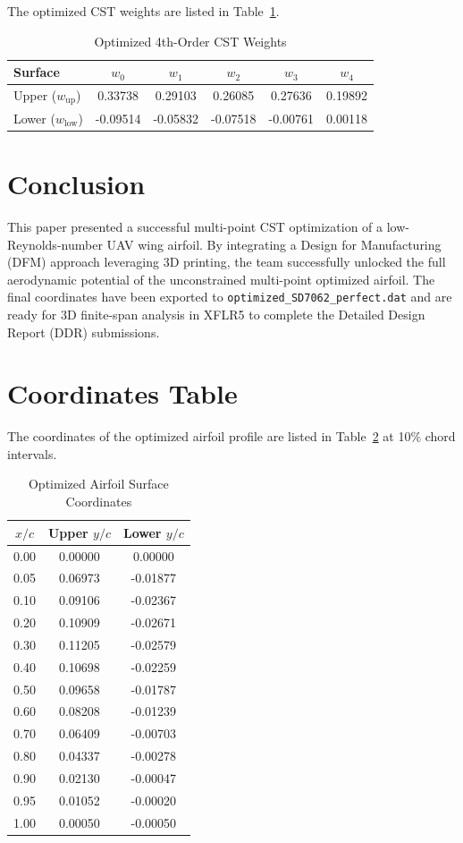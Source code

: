 \documentclass[11pt]{article}
\begin{document}
The optimized CST weights are listed in Table~\ref{tab:weights}.

\begin{table}[h]
\centering
\caption{Optimized 4th-Order CST Weights}
\label{tab:weights}
\begin{tabular}{lccccc}
\toprule
Surface & $w_0$ & $w_1$ & $w_2$ & $w_3$ & $w_4$ \\
\midrule
Upper ($w_{\text{up}}$) & 0.33738 & 0.29103 & 0.26085 & 0.27636 & 0.19892 \\
Lower ($w_{\text{low}}$) & -0.09514 & -0.05832 & -0.07518 & -0.00761 & 0.00118 \\
\bottomrule
\end{tabular}
\end{table}

\section{Conclusion}
This paper presented a successful multi-point CST optimization of a low-Reynolds-number UAV wing airfoil. By integrating a Design for Manufacturing (DFM) approach leveraging 3D printing, the team successfully unlocked the full aerodynamic potential of the unconstrained multi-point optimized airfoil. The final coordinates have been exported to \texttt{optimized\_SD7062\_perfect.dat} and are ready for 3D finite-span analysis in XFLR5 to complete the Detailed Design Report (DDR) submissions.

\appendix
\section{Coordinates Table}
The coordinates of the optimized airfoil profile are listed in Table~\ref{tab:coords} at 10\% chord intervals.

\begin{table}[h]
\centering
\caption{Optimized Airfoil Surface Coordinates}
\label{tab:coords}
\begin{tabular}{ccc}
\toprule
$x/c$ & Upper $y/c$ & Lower $y/c$ \\
\midrule
0.00 & 0.00000 & 0.00000 \\
0.05 & 0.06973 & -0.01877 \\
0.10 & 0.09106 & -0.02367 \\
0.20 & 0.10909 & -0.02671 \\
0.30 & 0.11205 & -0.02579 \\
0.40 & 0.10698 & -0.02259 \\
0.50 & 0.09658 & -0.01787 \\
0.60 & 0.08208 & -0.01239 \\
0.70 & 0.06409 & -0.00703 \\
0.80 & 0.04337 & -0.00278 \\
0.90 & 0.02130 & -0.00047 \\
0.95 & 0.01052 & -0.00020 \\
1.00 & 0.00050 & -0.00050 \\
\bottomrule
\end{tabular}
\end{table}
\end{document}
